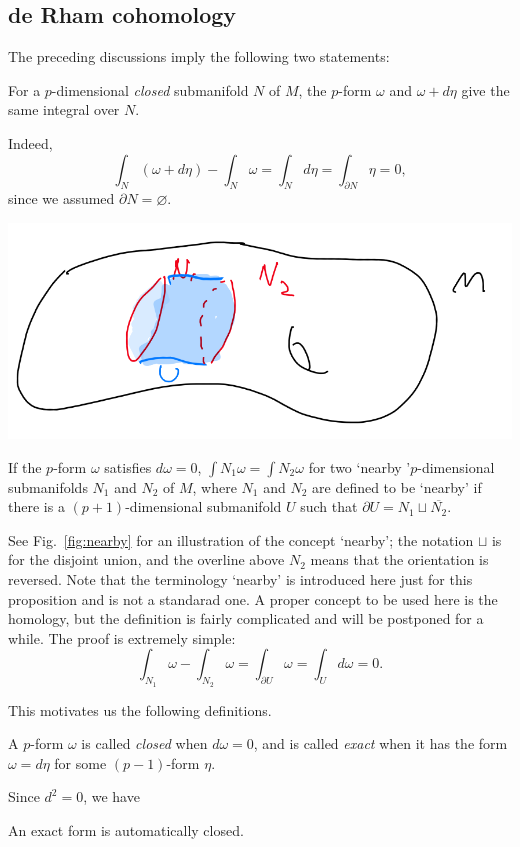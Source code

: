 \documentclass[12pt]{article}
\numberwithin{equation}{section}
\theoremstyle{remark}
\renewenvironment{figure}[1][]{
  \begin{originalfigure}[#1]
    \begin{mdframed}[linecolor=black!0,backgroundcolor=black!1]
}{
    \end{mdframed}
  \end{originalfigure}
}
\begin{document}
\subsection{de Rham cohomology}

The preceding discussions imply the following two statements:
\begin{proposition}
For a $p$-dimensional \emph{closed} submanifold $N$ of $M$,
the $p$-form $\omega$ and $\omega+d\eta$ give the same integral over $N$.
\end{proposition}
Indeed, \begin{equation}
  \int_N (\omega+d\eta)-\int_N \omega=\int_N d\eta=\int_{\partial N} \eta=0,
\end{equation}
since we assumed $\partial N=\varnothing$.

\begin{figure}[h]
  \centering
  \includegraphics[width=.5\textwidth]{nearby.png}
  \caption{Two `nearby' submanifolds $N_1$ and $N_2$ within $M$.}
  \label{fig:nearby}
  \end{figure}
  
\begin{proposition}
  If the $p$-form $\omega$ satisfies $d\omega=0$,
  $\int N_1 \omega = \int N_2 \omega$ for two `nearby '$p$-dimensional  submanifolds $N_1$ and $N_2$ of $M$, 
  where $N_1$ and $N_2$ are defined to be `nearby' 
  if there is a $(p+1)$-dimensional submanifold $U$ such that $\partial U = N_1\sqcup \overline{N_2}$.
\end{proposition}
See Fig.~\ref{fig:nearby} for an illustration of the concept `nearby';
the notation $\sqcup$ is for the disjoint union,
and the overline above $N_2$ means that the orientation is reversed. 
Note that the terminology `nearby' is introduced here just for this proposition
and is not a standarad one.
A proper concept to be used here is the homology, but the definition is fairly complicated and will be postponed for a while.
The proof is extremely simple: \begin{equation}
\int_{N_1} \omega - \int_{N_2} \omega = \int_{\partial U}\omega=\int_U d\omega = 0.
\end{equation}

This motivates us the following definitions.
\begin{definition}
A $p$-form $\omega$ is called \emph{closed} when $d\omega=0$,
and is called \emph{exact} when it has the form $\omega=d\eta$ for some $(p-1)$-form $\eta$.
\end{definition}
Since $d^2=0$, we have
\begin{proposition}
An exact form is automatically closed.
\end{proposition}
\end{document}

